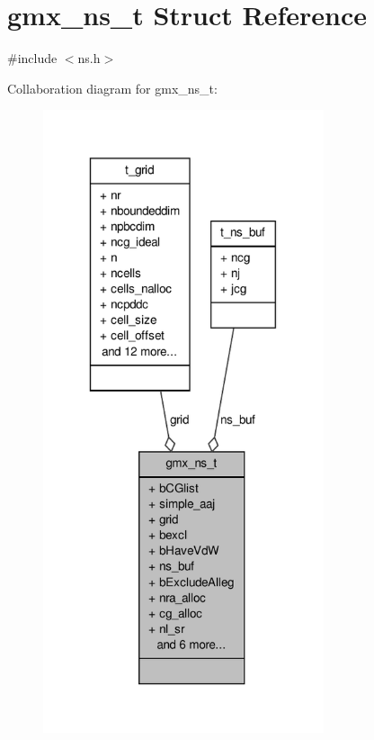 \hypertarget{structgmx__ns__t}{\section{gmx\-\_\-ns\-\_\-t \-Struct \-Reference}
\label{structgmx__ns__t}
}


{\ttfamily \#include $<$ns.\-h$>$}



\-Collaboration diagram for gmx\-\_\-ns\-\_\-t\-:
\nopagebreak
\begin{figure}[H]
\begin{center}
\leavevmode
\includegraphics[width=234pt]{structgmx__ns__t__coll__graph}
\end{center}
\end{figure}
